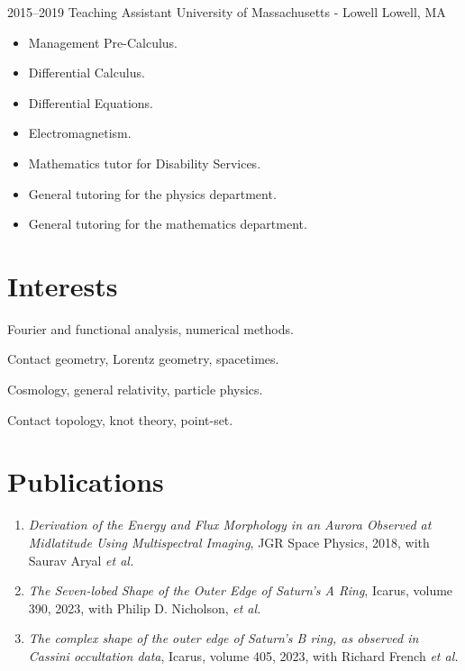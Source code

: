 \documentclass[a4paper,sans]{moderncv}
\begin{document}
            {2015--2019}
            {Teaching Assistant}
            {University of Massachusetts - Lowell}
            {Lowell, MA}
            {}
            {%
                \begin{itemize}
                    \item
                        Management Pre-Calculus.
                    \item
                        Differential Calculus.
                    \item
                        Differential Equations.
                    \item
                        Electromagnetism.
                    \item
                        Mathematics tutor for Disability Services.
                    \item
                        General tutoring for the physics department.
                    \item
                        General tutoring for the mathematics department.
                \end{itemize}%
            }
    \section{Interests}
            Fourier and functional analysis, numerical methods.\par
            Contact geometry, Lorentz geometry, spacetimes.\par
            Cosmology, general relativity, particle physics.\par
            Contact topology, knot theory, point-set.
    \section{Publications}
        \begin{enumerate}
            \item
                \textit{Derivation of the Energy and Flux Morphology in an
                Aurora Observed at Midlatitude Using Multispectral Imaging},
                JGR Space Physics, 2018, with Saurav Aryal \textit{et al.}
            \item
                \textit{The Seven-lobed Shape of the Outer
                Edge of Saturn’s A Ring}, Icarus, volume 390, 2023, with
                Philip D. Nicholson, \textit{et al.}
            \item
                \textit{The complex shape of the outer edge of Saturn’s B ring,
                as observed in Cassini occultation data},
                Icarus, volume 405, 2023, with Richard French \textit{et al.}
        \end{enumerate}
\end{document}

